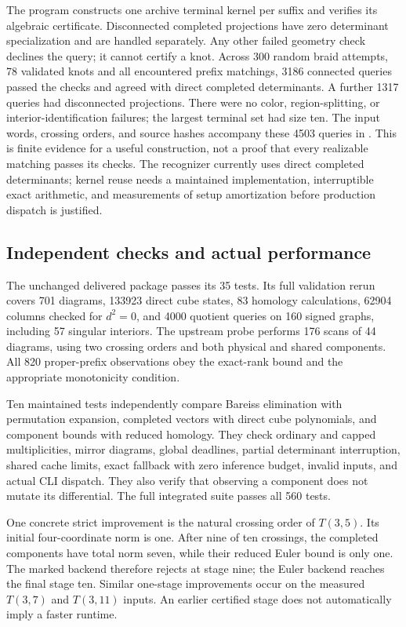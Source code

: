 The program constructs one archive terminal kernel per suffix and verifies
its algebraic certificate.  Disconnected completed projections have zero
determinant specialization and are handled separately.  Any other failed
geometry check declines the query; it cannot certify a knot.
Across 300 random braid attempts, 78 validated knots and all encountered
prefix matchings, 3186 connected queries passed the checks and agreed
with direct completed determinants.  A further 1317 queries had
disconnected projections.  There were no color, region-splitting, or
interior-identification failures; the largest terminal set had size ten.
The input words, crossing orders, and source hashes accompany these
4503 queries in .
This is finite evidence for a useful construction, not a proof that every
realizable matching passes its checks.  The recognizer currently uses
direct completed determinants; kernel reuse needs a maintained
implementation, interruptible exact arithmetic, and measurements of
setup amortization before production dispatch is justified.

\subsection{Independent checks and actual performance}

The unchanged delivered package passes its 35 tests.  Its full validation
rerun covers 701 diagrams, 133923 direct cube states, 83 homology
calculations, 62904 columns checked for $d^2=0$, and 4000 quotient queries
on 160 signed graphs, including 57 singular interiors.  The upstream
probe performs 176 scans of 44 diagrams, using two crossing orders and
both physical and shared components.  All 820 proper-prefix observations
obey the exact-rank bound and the appropriate monotonicity condition.

Ten maintained tests independently compare Bareiss elimination with
permutation expansion, completed vectors with direct cube polynomials,
and component bounds with reduced homology.  They check ordinary and
capped multiplicities, mirror diagrams, global deadlines, partial
determinant interruption, shared cache limits, exact fallback with zero
inference budget, invalid inputs, and actual CLI dispatch.  They also
verify that observing a component does not mutate its differential.
The full integrated suite passes all 560 tests.

One concrete strict improvement is the natural crossing order of $T(3,5)$.
Its initial four-coordinate norm is one.  After nine of ten crossings,
the completed components have total norm seven, while their reduced
Euler bound is only one.  The marked backend therefore rejects at stage
nine; the Euler backend reaches the final stage ten.  Similar one-stage
improvements occur on the measured $T(3,7)$ and $T(3,11)$ inputs.
An earlier certified stage does not automatically imply a faster runtime.

